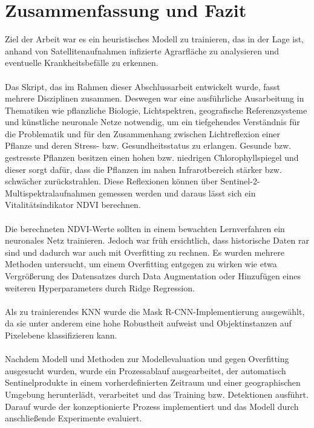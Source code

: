 \chapter{Zusammenfassung und Fazit}\label{chap:summary}

Ziel der Arbeit war es ein heuristisches Modell zu trainieren, das in der Lage ist, anhand von Satellitenaufnahmen infizierte Agrarfläche zu analysieren und eventuelle Krankheitsbefälle zu erkennen. 
\\\\
Das Skript, das im Rahmen dieser Abschlussarbeit entwickelt wurde, fasst mehrere Disziplinen zusammen. Deswegen war eine ausführliche Ausarbeitung in Thematiken wie pflanzliche Biologie, Lichtspektren, geografische Referenzsysteme und künstliche neuronale Netze notwendig, um ein tiefgehendes Verständnis für die Problematik und für den Zusammenhang zwischen Lichtreflexion einer Pflanze und deren Stress- bzw. Gesundheitsstatus zu erlangen. Gesunde bzw. gestresste Pflanzen besitzen einen hohen bzw. niedrigen Chlorophyllspiegel und dieser sorgt dafür, dass die Pflanzen im nahen Infrarotbereich stärker bzw. schwächer zurückstrahlen. Diese Reflexionen können über Sentinel-2-Multispektralaufnahmen gemessen werden und daraus lässt sich ein Vitalitätsindikator NDVI berechnen.
\\\\
Die berechneten NDVI-Werte sollten in einem bewachten Lernverfahren ein neuronales Netz trainieren. Jedoch war früh ersichtlich, dass historische Daten rar sind und dadurch war auch mit Overfitting zu rechnen. Es wurden mehrere Methoden untersucht, um einem Overfitting entgegen zu wirken wie etwa Vergrößerung des Datensatzes durch Data Augmentation oder Hinzufügen eines weiteren Hyperparameters durch Ridge Regression. 
\\\\
Als zu trainierendes KNN wurde die Mask R-CNN-Implementierung ausgewählt, da sie unter anderem eine hohe Robustheit aufweist und Objektinstanzen auf Pixelebene klassifizieren kann. 
\\\\
Nachdem Modell und Methoden zur Modellevaluation und gegen Overfitting ausgesucht wurden, wurde ein Prozessablauf ausgearbeitet, der automatisch Sentinelprodukte in einem vorherdefinierten Zeitraum und einer geographischen Umgebung herunterlädt, verarbeitet und das Training bzw. Detektionen ausführt. Darauf wurde der konzeptionierte Prozess implementiert und das Modell durch anschließende Experimente evaluiert.
\\\\
